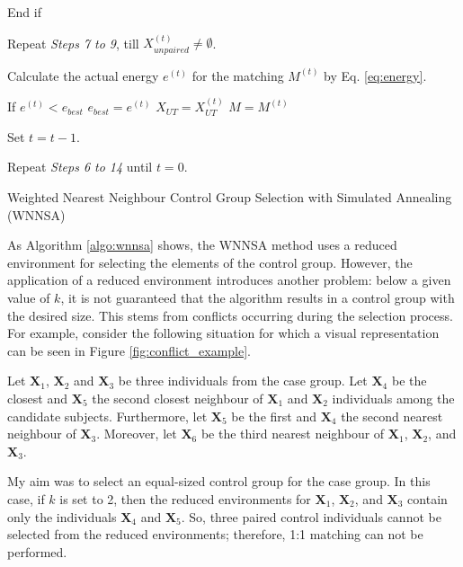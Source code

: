 \begin{algorithm}
			\text{\quad}\text{\quad}End if
																
			Repeat \textit{Steps 7 to 9}, till $X_{unpaired}^{(t)}\neq\emptyset$.
																
			Calculate the actual energy $e^{(t)}$ for the matching $M^{(t)}$ by Eq. \ref{eq:energy}.
																
			If $e^{(t)}<e_{best}$
			\linebreak
			\text{\quad}
			$e_{best}=e^{(t)}$
			\linebreak
			\text{\quad}
			$X_{UT}=X_{UT}^{(t)}$
			\linebreak
			\text{\quad}
			$M=M^{(t)}$
																
			Set $t=t-1$.
																
			Repeat \textit{Steps 6 to 14} until  $t=0$.
																
			\caption{Weighted Nearest Neighbour Control Group Selection with Simulated Annealing (WNNSA)}
			\label{algo:wnnsa}
		\end{algorithm}
										
		As Algorithm \ref{algo:wnnsa} shows, the WNNSA method uses a reduced environment for selecting the elements of the control group. However, the application of a reduced environment introduces another problem: below a given value of $k$, it is not guaranteed that the algorithm results in a control group with the desired size. This stems from conflicts occurring during the selection process. For example, consider the following situation for which a visual representation can be seen in Figure \ref{fig:conflict_example}.
										
		Let $\textbf{X}_1$, $\textbf{X}_2$ and $\textbf{X}_3$ be three individuals from the case group. Let $\textbf{X}_4$ be the closest and $\textbf{X}_5$ the second closest neighbour of $\textbf{X}_1$ and $\textbf{X}_2$ individuals among the candidate subjects. Furthermore, let $\textbf{X}_5$ be the first and $\textbf{X}_4$ the second nearest neighbour of $\textbf{X}_3$. Moreover, let $\textbf{X}_6$ be the third nearest neighbour of $\textbf{X}_1$, $\textbf{X}_2$, and $\textbf{X}_3$.
										
		My aim was to select an equal-sized control group for the case group. In this case, if $k$ is set to 2, then the reduced environments for $\textbf{X}_1$, $\textbf{X}_2$, and $\textbf{X}_3$ contain only the individuals $\textbf{X}_4$ and $\textbf{X}_5$. So, three paired control individuals cannot be selected from the reduced environments; therefore, 1:1 matching can not be performed.
										
